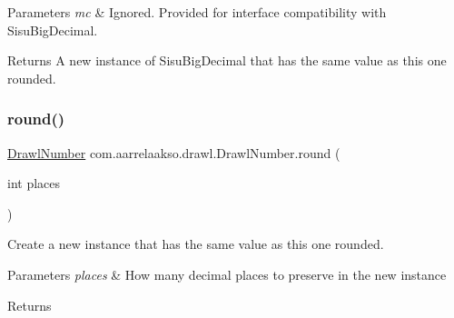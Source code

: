 \begin{DoxyParams}{Parameters}
{\em mc} & Ignored. Provided for interface compatibility with Sisu\+Big\+Decimal. \\
\hline
\end{DoxyParams}
\begin{DoxyReturn}{Returns}
A new instance of Sisu\+Big\+Decimal that has the same value as this one rounded. 
\end{DoxyReturn}
\mbox{\label{classcom_1_1aarrelaakso_1_1drawl_1_1_drawl_number_ac5efac0046896d23bab3569661a2d32c}} 
\subsubsection{\texorpdfstring{round()}{round()}\hspace{0.1cm}{\footnotesize\ttfamily [2/2]}}
{\footnotesize\ttfamily \hyperlink{classcom_1_1aarrelaakso_1_1drawl_1_1_drawl_number}{Drawl\+Number} com.\+aarrelaakso.\+drawl.\+Drawl\+Number.\+round (\begin{DoxyParamCaption}\item[{int}]{places }\end{DoxyParamCaption})\hspace{0.3cm}{\ttfamily [protected]}}



Create a new instance that has the same value as this one rounded. 


\begin{DoxyParams}{Parameters}
{\em places} & How many decimal places to preserve in the new instance \\
\hline
\end{DoxyParams}
\begin{DoxyReturn}{Returns}

\end{DoxyReturn}
\mbox{\label{classcom_1_1aarrelaakso_1_1drawl_1_1_drawl_number_a4a9de57548307feaf7e703e5428422f5}} 

